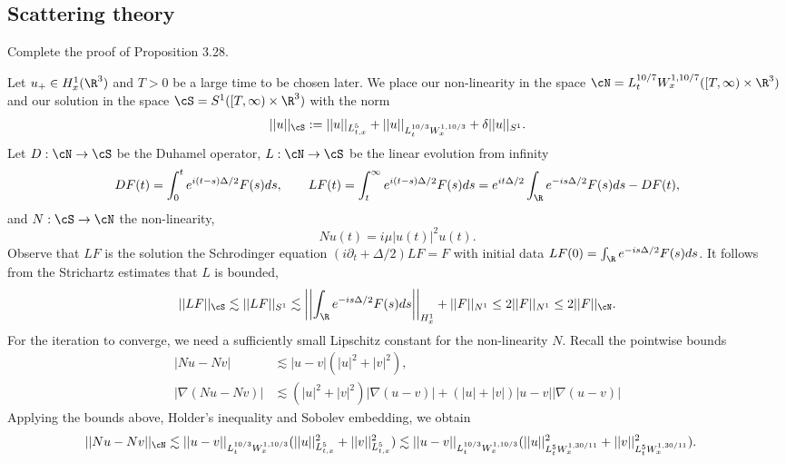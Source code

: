 \begin{solution}
	
\end{solution}

\subsection{Scattering theory}

\begin{statement}
	Complete the proof of Proposition 3.28.
\end{statement}

\begin{solution}
	Let $u_+ \in H^1_x (\R^3)$ and $T > 0$ be a large time to be chosen later. We place our non-linearity in the space $\cN = L^{10/7}_t W^{1, 10/7}_x ([T, \infty) \times \R^3)$ and our solution in the space $\cS = S^1 ([T, \infty) \times \R^3)$ with the norm
		\[ ||u||_{\cS} := ||u||_{L^5_{t, x}} + ||u||_{L^{10/3}_t W^{1, 10/3}_x} + \delta ||u||_{S^1}. \]
	Let $D: \cN \to \cS$ be the Duhamel operator, $L: \cN \to \cS$ be the linear evolution from infinity
		\[ DF (t) = \int_0^t e^{i (t - s)\Delta/2} F(s) ds, \qquad LF (t) = \int_t^\infty e^{i (t - s) \Delta/2} F(s) ds = e^{i t \Delta/2} \int_\R e^{-i s \Delta/2} F(s) ds - DF(t),\]
	and $N : \cS \to \cN$ the non-linearity, 
		\[ Nu (t) = i \mu |u(t)|^2 u(t). \]
	Observe that $LF$ is the solution the Schrodinger equation $(i \partial_t + \Delta/2) LF = F$ with initial data $LF(0) = \int_\R e^{-i s \Delta/2} F(s) ds$. It follows from the Strichartz estimates  that $L$ is bounded, 
		\[ ||LF||_\cS \lesssim ||LF||_{S^1} \lesssim \left|\left| \int_\R e^{-i s \Delta/2} F(s) ds \right| \right|_{H^1_x} + ||F||_{N^1} \leq 2 ||F||_{N^1} \leq 2||F||_\cN . \]
	For the iteration to converge, we need a sufficiently small Lipschitz constant for the non-linearity $N$. Recall the pointwise bounds
		\begin{align*}
			 |Nu - Nv| 
			 	&\lesssim |u - v|(|u|^2 + |v|^2), \\
			  |\nabla (Nu - Nv) |
			  	&\lesssim (|u|^2 + |v|^2) |\nabla (u - v)| + (|u| + |v|) |u - v| |\nabla (u - v)| 
		\end{align*}	 
	Applying the bounds above, Holder's inequality and Sobolev embedding, we obtain
		\begin{align*}
			||Nu - Nv||_{\cN}
				&\lesssim || u - v ||_{L^{10/3}_{t} W^{1, 10/3}_x} (||u||^2_{L^5_{t, x}} + ||v||_{L^5_{t, x}}^2) \lesssim || u - v ||_{L^{10/3}_{t} W^{1, 10/3}_x} (||u||^2_{L^5_{t} W^{1, 30/11}_x} + ||v||_{L^5_{t} W^{1, 30/11}_x}^2) .

\end{align*}
\end{solution}
